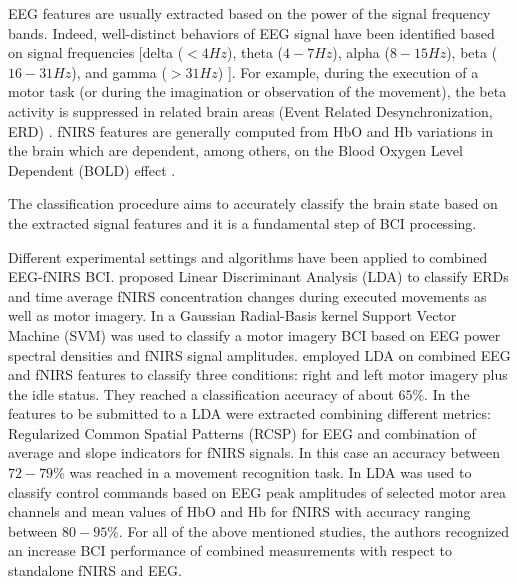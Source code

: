 \documentclass[12pt]{iopart}
\begin{document}
EEG features are usually extracted based on the power of the signal frequency bands. Indeed, well-distinct behaviors of EEG signal have been identified based on signal frequencies [delta ($< 4 Hz$), theta ($4-7 Hz$), alpha ($8-15 Hz$), beta ($16-31 Hz$), and gamma ($> 31 Hz$) \parencite{nuwer1988quantitative}]. For example, during the execution of a motor task (or during the imagination or observation of the movement), the beta activity is suppressed in related brain areas (Event Related Desynchronization, ERD) \parencite{pfurtscheller2001functional, pfurtscheller2006future}.  
fNIRS  features are generally  computed from  HbO and Hb variations in the brain which are dependent, among others, on the  Blood Oxygen Level Dependent (BOLD) effect \parencite{steinbrink2006illuminating, naseer2015fnirs}. 

The classification procedure aims to accurately classify the brain state  based on the extracted signal features  and it is a fundamental step of BCI processing.


Different  experimental settings and algorithms have been applied  to combined EEG-fNIRS BCI.  \textcite{Fazli_2012} proposed Linear Discriminant Analysis (LDA) to classify ERDs and time average fNIRS concentration changes during executed movements as well as motor imagery.  In \textcite{ma2012hybrid} a Gaussian Radial-Basis kernel Support Vector Machine (SVM) was used to classify a motor imagery BCI based on EEG power spectral densities and fNIRS signal amplitudes.   \textcite{lee2014hybrid} employed LDA on combined EEG and fNIRS features to classify three conditions: right and left motor imagery plus the idle status. They reached a classification accuracy of about $65\%$. In \textcite{buccino2016hybrid} the features to be submitted to a LDA were extracted combining different metrics: Regularized Common Spatial Patterns (RCSP) for EEG and combination of average and slope indicators for fNIRS signals. In this case an accuracy between $72-79\%$ was reached in a movement recognition task. In  \textcite{khan2014decoding, khan2017hybrid} LDA was used to classify control commands based on EEG peak amplitudes of selected motor area channels and mean values of HbO and Hb for fNIRS with accuracy ranging between $80-95\%$.
For all of the above mentioned studies, the authors recognized an increase BCI performance of combined measurements with respect to standalone fNIRS and EEG.
\end{document}
